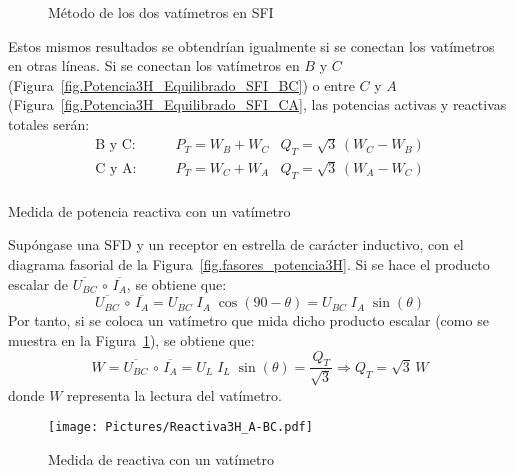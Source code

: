 \documentclass[11pt]{book} %
\makeatletter
\numberwithin{dummy}{section}
\theoremstyle{ocrenumbox}
\theoremstyle{blacknumex}
\theoremstyle{blacknumbox}
\theoremstyle{ocrenum}
\renewcommand{\subsection}{\@startsection {subsection}{2}{\z@}
{-3ex \@plus -0.1ex \@minus -.4ex}
{0.5ex \@plus.2ex }
{\normalfont\sffamily\bfseries}}
\makeatother
\begin{document}
\begin{figure}[htbp]
    \centering
    \hfill
    \caption{Método de los dos vatímetros en SFI}
\end{figure}
Estos mismos resultados se obtendrían igualmente si se conectan los vatímetros en otras líneas. Si se conectan los vatímetros en $B$ y $C$ (Figura~\ref{fig.Potencia3H_Equilibrado_SFI_BC}) o entre $C$ y $A$ (Figura~\ref{fig.Potencia3H_Equilibrado_SFI_CA}, las potencias activas y reactivas totales serán: 
\begin{align*}
    \text{B y C}: &\qquad P_T=W_B + W_C  &Q_T=\sqrt{3}\,(W_C - W_B)\\
    \text{C y A}: &\qquad P_T=W_C + W_A  &Q_T=\sqrt{3}\,(W_A - W_C)\\
\end{align*}


\subsection{Medida de potencia reactiva con un vatímetro}

Supóngase una SFD y un receptor en estrella de carácter inductivo, con el diagrama fasorial de la Figura~\ref{fig.fasores_potencia3H}. Si se hace el producto escalar de $\overline{U_{BC}}\,\circ\,\overline{I_A}$, se obtiene que:
\begin{equation*}
    \overline{U_{BC}}\,\circ\,\overline{I_A}=U_{BC}\;I_A\;\cos(90-\theta)=U_{BC}\;I_A\;\sin(\theta)
\end{equation*}
Por tanto, si se coloca un vatímetro que mida dicho producto escalar (como se muestra en la Figura~\ref{fig.Reactiva3H_A-BC}), se obtiene que: 
\begin{equation}
    W=\overline{U_{BC}}\,\circ\,\overline{I_A}=U_{L}\;I_L\;\sin(\theta)=\dfrac{Q_T}{\sqrt{3}}\Rightarrow \boxed{Q_T=\sqrt{3}\,W}
\end{equation}
donde $W$ representa la lectura del vatímetro. 
\begin{figure}[htbp]
    \centering
    \texttt{[image: Pictures/Reactiva3H\_A-BC.pdf]}
    \caption{Medida de reactiva con un vatímetro}
    \label{fig.Reactiva3H_A-BC}
\end{figure}
\end{document}
